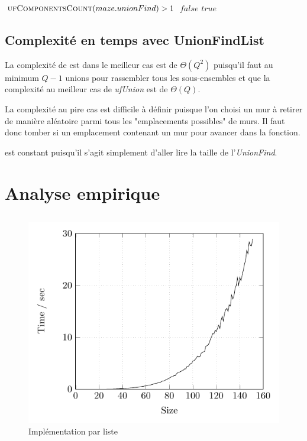 \begin{codebox}
\li \If $\textnormal{\scshape ufComponentsCount}(maze.unionFind) > 1$
\li \Then \Return $false$
\li \Else
\li \Return $true$
\End
\End
\end{codebox}

\subsection{Complexité en temps avec UnionFindList} %
La complexité de  est dans le meilleur cas est de $\Theta(Q^2)$ puisqu'il faut au minimum $Q-1$ unions pour rassembler tous les sous-ensembles et que la complexité au meilleur cas de \textit{ufUnion} est de $\Theta(Q)$.

La complexité au pire cas est difficile à définir puisque l'on choisi un mur à retirer de manière aléatoire parmi tous les "emplacements possibles" de murs. Il faut donc tomber si un emplacement contenant un mur pour avancer dans la fonction.

\bigbreak
{} est constant puisqu'il s'agit simplement d'aller lire la taille de l'\textit{UnionFind}.

\section{Analyse empirique}
\subsection{} %
	\begin{figure}[h]
		\caption{Implémentation par liste}
		\includegraphics{Tests/List/list}
	\end{figure}

